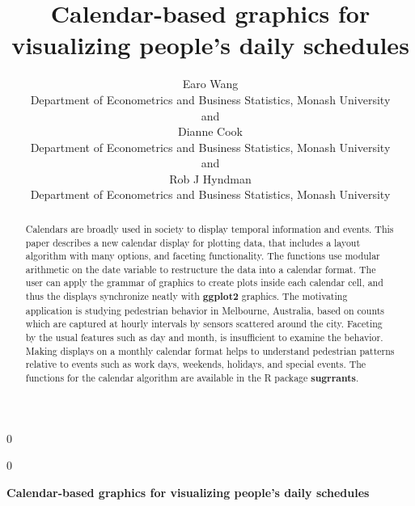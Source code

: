 \documentclass[12pt]{article}
\newcommand{\blind}{0}
\begin{document}
\def\spacingset#1{\renewcommand{\baselinestretch}%
{#1}\small\normalsize} \spacingset{1}



\blind
{
  \title{\bf Calendar-based graphics for visualizing people's daily schedules}

  \author{
        Earo Wang \\
    Department of Econometrics and Business Statistics, Monash University\\
     and \\     Dianne Cook \\
    Department of Econometrics and Business Statistics, Monash University\\
     and \\     Rob J Hyndman \\
    Department of Econometrics and Business Statistics, Monash University\\
      }
  \maketitle
} \fi

\blind
{
  \bigskip
  \bigskip
  \bigskip
  \begin{center}
    {\LARGE\bf Calendar-based graphics for visualizing people's daily schedules}
  \end{center}
  \medskip
} \fi

\bigskip
\begin{abstract}
Calendars are broadly used in society to display temporal information and events. This paper describes a new calendar display for plotting data, that includes a layout algorithm with many options, and faceting functionality. The functions use modular arithmetic on the date variable to restructure the data into a calendar format. The user can apply the grammar of graphics to create plots inside each calendar cell, and thus the displays synchronize neatly with \textbf{ggplot2} graphics. The motivating application is studying pedestrian behavior in Melbourne, Australia, based on counts which are captured at hourly intervals by sensors scattered around the city. Faceting by the usual features such as day and month, is insufficient to examine the behavior. Making displays on a monthly calendar format helps to understand pedestrian patterns relative to events such as work days, weekends, holidays, and special events. The functions for the calendar algorithm are available in the R package \textbf{sugrrants}.
\end{abstract}
\end{document}
